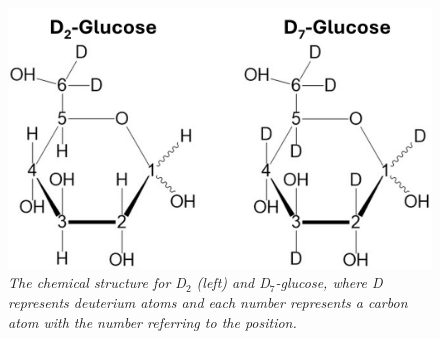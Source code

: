 \begin{figure}
    \centering
    \includegraphics[width = 1\textwidth]{Figures/Glucose/Glucose.png}
    \caption{\textit{The chemical structure for D$_2$ (left) and D$_7$-glucose, where D represents deuterium atoms and each number represents a carbon atom with the number referring to the position.}}
    \label{fig:Glu:Glucose}
\end{figure}


